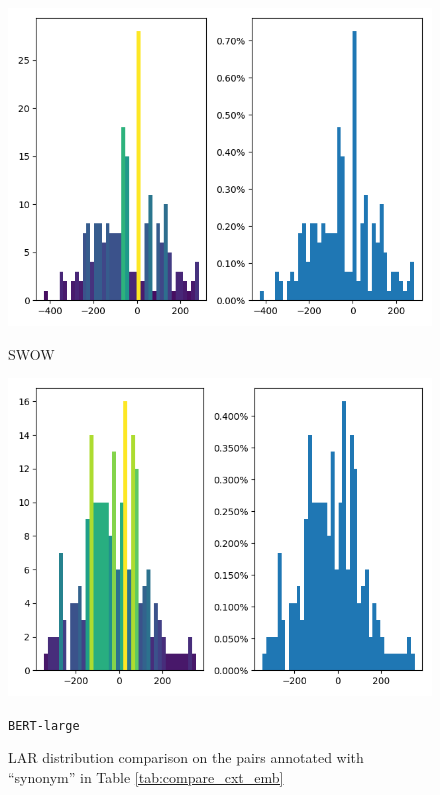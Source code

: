 \documentclass[letterpaper]{article} %
\begin{document}
\begin{figure}[!]
\centering
\begin{minipage}[b]{0.45\textwidth}
    \includegraphics[width=\textwidth]{rel_synonym_gtSWOW_bert_large.png}
    \caption*{SWOW}
  \end{minipage}
  \hfill
  \begin{minipage}[b]{0.45\textwidth}
    \includegraphics[width=\textwidth]{rel_synonymSWOW_bert_large.png}
    \caption*{\texttt{BERT-large}}
  \end{minipage}
\caption{LAR distribution comparison on the pairs annotated with ``synonym'' in Table \ref{tab:compare_cxt_emb} }
\label{fig:compare_lar_synonym}
\end{figure}
\end{document}
